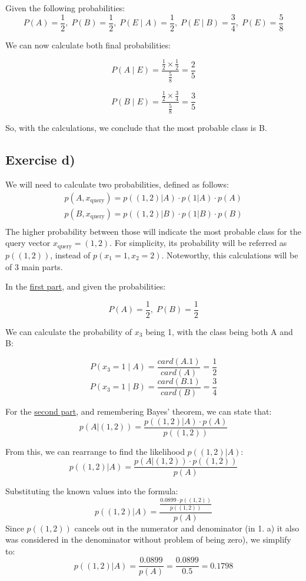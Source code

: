 \documentclass{article}
\begin{document}
Given the following probabilities:
\[
P(A) = \frac{1}{2},\;P(B) = \frac{1}{2},\;P(E \mid A ) = \frac{1}{2},\;P(E \mid B) = \frac{3}{4},\;P(E) = \frac{5}{8}
\]

We can now calculate both final probabilities:

\[P(A \mid E) = \frac{\frac{1}{2} \times \frac{1}{2}}{\frac{5}{8}} = \frac{2}{5}\]

\[P(B \mid E) = \frac{\frac{1}{2} \times \frac{3}{4}}{\frac{5}{8}} = \frac{3}{5}\]

So, with the calculations, we conclude that the most probable class is B.

\subsection{Exercise d)}
We will need to calculate two probabilities, defined as follows:
\begin{align*}
    p(A, x_\text{query}) = p((1,2) | A) \cdot p(1 | A) \cdot p(A) \\
    p(B, x_\text{query}) = p((1,2) | B) \cdot p(1 | B) \cdot p(B) \\
\end{align*}
The higher probability between those will indicate the most probable class for the query vector \( x_\text{query} = (1,2) \). For simplicity, its probability will be referred as \(p((1,2))\), instead of \(p(x_1 = 1, x_2 = 2)\).
Noteworthy, this calculations will be of 3 main parts.

\bigskip
In the \underline{first part}, and given the probabilities:

\[
P(A) = \frac{1}{2},\;P(B) = \frac{1}{2}
\]

We can calculate the probability of \( x_3 \) being 1, with the class being both A and B:

\[
P(x_3 = 1 \mid A) = \frac{card(A.1)}{card(A)} = \frac{1}{2}
\]
\[
P(x_3 = 1 \mid B) = \frac{card(B.1)}{card(B)} = \frac{3}{4}
\]
\bigskip

For the \underline{second part}, and remembering Bayes' theorem, we can state that:
\[
p(A | (1,2)) = \frac{p((1,2) | A) \cdot p(A)}{p((1,2))}
\]

From this, we can rearrange to find the likelihood \( p((1,2) | A) \):
\[
p((1,2) | A) = \frac{p(A | (1,2)) \cdot p((1,2))}{p(A)}
\]

Substituting the known values into the formula:
\[
p((1,2) | A) = \frac{\frac{0.0899 \cdot p((1,2))}{p((1,2))}}{p(A)}
\]
Since \( p((1,2)) \) cancels out in the numerator and denominator (in 1. a) it also was considered in the denominator without problem of being zero), we simplify to:
\[
p((1,2) | A) = \frac{0.0899}{p(A)} = \frac{0.0899}{0.5} = 0.1798
\]
\end{document}

